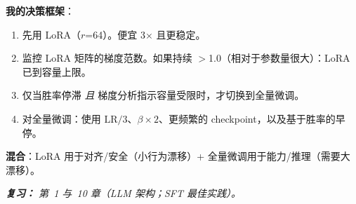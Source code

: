 \begin{questionbox}
\textbf{我的决策框架}：

\begin{enumerate}
  \item 先用 LoRA（$r$=64）。便宜 3$\times$ 且更稳定。
  \item 监控 LoRA 矩阵的梯度范数。如果持续 $>$1.0（相对于参数量很大）：LoRA 已到容量上限。
  \item 仅当胜率停滞 \emph{且} 梯度分析指示容量受限时，才切换到全量微调。
  \item 对全量微调：使用 $\text{LR}/3$、$\beta \times 2$、更频繁的 checkpoint，以及基于胜率的早停。
\end{enumerate}

\textbf{混合}：LoRA 用于对齐/安全（小行为漂移）+ 全量微调用于能力/推理（需要大漂移）。

\emph{\textbf{复习：} 第~1 与~10 章（LLM 架构；SFT 最佳实践）。}
\end{questionbox}

